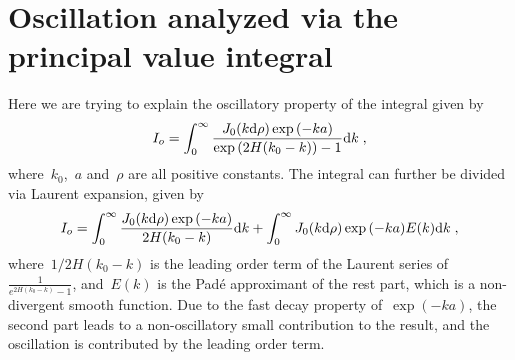 \section{Oscillation analyzed via the principal value integral}\label{sec::oscillation}

Here we are trying to explain the oscillatory property of the integral given by
\begin{equation}
    I_o = \int_0^{\infty} \frac{J_0(k \mathrm{d} \rho) \exp{(-k a)}}{\exp{(2H(k_0 - k))} - 1} \text{d}k\;,
\end{equation}
where~$k_0$,~$a$ and~$\rho$ are all positive constants.
The integral can further be divided via Laurent expansion, given by
\begin{equation}
    I_o = \int_0^{\infty} \frac{J_0(k \mathrm{d} \rho) \exp{(-k a)}}{2H(k_0 - k)} \text{d}k + \int_0^{\infty} J_0(k \mathrm{d} \rho) \exp{(-k a)} E(k) \text{d}k\;,
\end{equation}
where~$1/2H(k_0 - k)$ is the leading order term of the Laurent series of~$\frac{1}{e^{2H(k_0 - k)} - 1}$, and~$E(k)$ is the Padé approximant of the rest part, which is a non-divergent smooth function.
Due to the fast decay property of~$\exp{(-k a)}$, the second part leads to a non-oscillatory small contribution to the result, and the oscillation is contributed by the leading order term.


